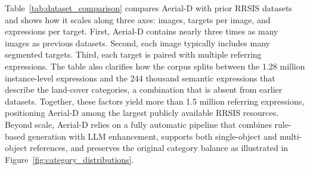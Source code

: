 Table~\ref{tab:dataset_comparison} compares Aerial-D with prior RRSIS datasets and shows how it scales along three axes: images, targets per image, and expressions per target. First, Aerial-D contains nearly three times as many images as previous datasets. Second, each image typically includes many segmented targets. Third, each target is paired with multiple referring expressions. The table also clarifies how the corpus splits between the 1.28 million instance-level expressions and the 244 thousand semantic expressions that describe the land-cover categories, a combination that is absent from earlier datasets. Together, these factors yield more than 1.5 million referring expressions, positioning Aerial-D among the largest publicly available RRSIS resources. Beyond scale, Aerial-D relies on a fully automatic pipeline that combines rule-based generation with LLM enhancement, supports both single-object and multi-object references, and preserves the original category balance as illustrated in Figure~\ref{fig:category_distributions}.

\begin{table}[t]
\centering
\caption{Comparison with Existing RRSIS Datasets}
\label{tab:dataset_comparison}
\end{table}

